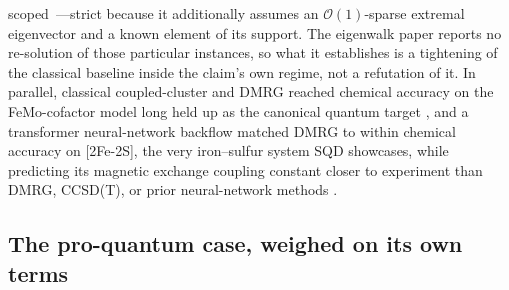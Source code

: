 \documentclass[onecolumn,a4paper]{quantumarticle}
\begin{document}
scoped~\cite{kirby2026}---strict because it additionally assumes an $\mathcal{O}(1)$-sparse extremal eigenvector and a known element of its support. The eigenwalk paper reports no re-solution of those particular instances, so what it establishes is a tightening of the classical baseline inside the claim's own regime, not a refutation of it. In parallel, classical coupled-cluster and DMRG reached chemical accuracy on the FeMo-cofactor model long held up as the canonical quantum target \cite{zhai2026}, and a transformer neural-network backflow matched DMRG to within chemical accuracy on [2Fe-2S], the very iron--sulfur system SQD showcases, while predicting its magnetic exchange coupling constant closer to experiment than DMRG, CCSD(T), or prior neural-network methods \cite{ma2025}.


\subsection{The pro-quantum case, weighed on its own terms}\label{sec:5-4}
\end{document}
